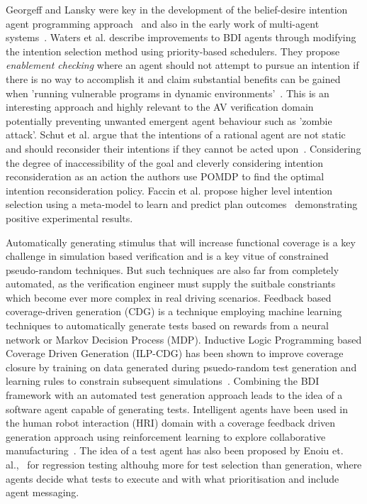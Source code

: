 \documentclass[letterpaper, 10 pt, journal, twoside]{IEEEtran}
\begin{document}
Georgeff and Lansky were key in the development of the belief-desire intention agent programming approach~\cite{georgeff1987reactive} and also in the early work of multi-agent systems~\cite{georgeff1988communication}.
%
Waters et al. describe improvements to BDI agents through modifying the intention selection method using priority-based schedulers. They propose \textit{enablement checking} where an agent should not attempt to pursue an intention if there is no way to accomplish it and claim substantial benefits can be gained when 'running vulnerable programs in dynamic environments'~\cite{Waters2015}. This is an interesting approach and highly relevant to the AV verification domain potentially preventing unwanted emergent agent behaviour such as 'zombie attack'.
%
Schut et al. argue that the intentions of a rational agent are not static and should reconsider their intentions if they cannot be acted upon~\cite{Schut2004}. Considering the degree of inaccessibility of the goal and cleverly considering intention reconsideration as an action the authors use POMDP to find the optimal intention reconsideration policy. Faccin et al. propose higher level intention selection using a meta-model to learn and predict plan outcomes~\cite{faccin2015bdi} demonstrating positive experimental results.

Automatically generating stimulus that will increase functional coverage is a key challenge in simulation based verification and is a key vitue of constrained pseudo-random techniques. But such techniques are also far from completely automated, as the verification engineer must supply the suitbale constriants which become ever more complex in real driving scenarios. Feedback based coverage-driven generation (CDG) is a technique employing machine learning techniques to automatically generate tests based on rewards from a neural network or Markov Decision Process (MDP). Inductive Logic Programming based Coverage Driven Generation (ILP-CDG) has been shown to improve coverage closure by training on data generated during psuedo-random test generation and learning rules to constrain subsequent simulations~\cite{Eder2007}.
%
Combining the BDI framework with an automated test generation approach leads to the idea of a software agent capable of generating tests. Intelligent agents have been used in the human robot interaction (HRI) domain with a coverage feedback driven generation approach using reinforcement learning to explore collaborative manufacturing~\cite{Araiza-Illan2016}. The idea of a test agent has also been proposed by Enoiu et. al.,~\cite{Enoiu2019} for regression testing althouhg more for test selection than generation, where agents decide what tests to execute and with what prioritisation and include agent messaging.
\end{document}
